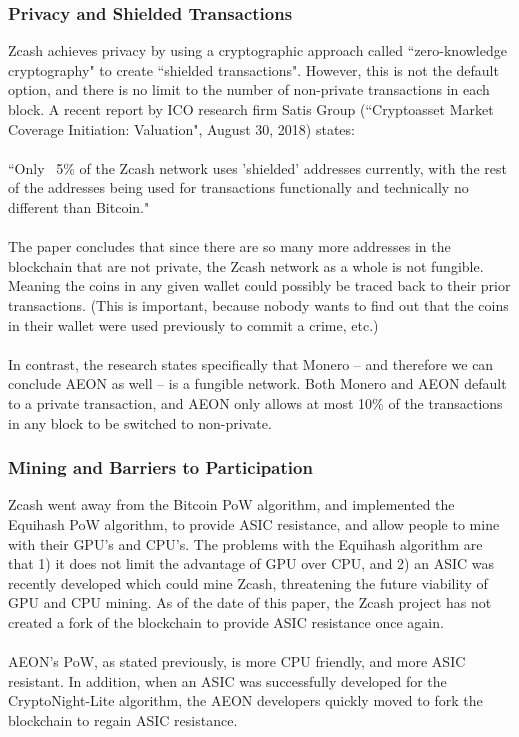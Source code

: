 \subsubsection{Privacy and Shielded Transactions}
Zcash achieves privacy by using a cryptographic approach called “zero-knowledge cryptography" to create “shielded transactions".  However, this is not the default option, and there is no limit to the number of non-private transactions in each block.  A recent report by ICO research firm Satis Group (“Cryptoasset Market Coverage Initiation: Valuation", August 30, 2018) states:\\
\\ 
“Only ~5\%  of the Zcash network uses 'shielded' addresses currently, with the rest of the addresses being used for transactions functionally and technically no different than Bitcoin."\\
\\
The paper concludes that since there are so many more addresses in the blockchain that are not private, the Zcash network as a whole is not fungible.  Meaning the coins in any given wallet could possibly be traced back to their prior transactions.  (This is important, because nobody wants to find out that the coins in their wallet were used previously to commit a crime, etc.)\\
\\
In contrast, the research states specifically that Monero -- and therefore we can conclude AEON as well -- is a fungible network.  Both Monero and AEON default to a private transaction, and AEON only allows at most 10\% of the transactions in any block to be switched to non-private.

\subsubsection{Mining and Barriers to Participation}
Zcash went away from the Bitcoin PoW algorithm, and implemented the Equihash PoW algorithm, to provide ASIC resistance, and allow people to mine with their GPU’s and CPU’s.  The problems with the Equihash algorithm are that 1) it does not limit the advantage of GPU over CPU, and 2) an ASIC was recently developed which could mine Zcash, threatening the future viability of GPU and CPU mining.   As of the date of this paper, the Zcash project has not created a fork of the blockchain to provide ASIC resistance once again.\\
\\
AEON's PoW, as stated previously, is more CPU friendly, and more ASIC resistant.  In addition, when an ASIC was successfully developed for the CryptoNight-Lite algorithm, the AEON developers quickly moved to fork the blockchain to regain ASIC resistance.

